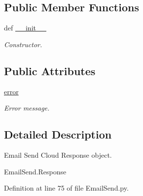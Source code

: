 \subsection*{Public Member Functions}
\begin{DoxyCompactItemize}
\item 
def \hyperlink{classRappCloud_1_1CloudMsgs_1_1EmailSend_1_1EmailSend_1_1Response_ac278f90863546918e2a7328700e0b972}{\-\_\-\-\_\-init\-\_\-\-\_\-}
\begin{DoxyCompactList}\small\item\em Constructor. \end{DoxyCompactList}\end{DoxyCompactItemize}
\subsection*{Public Attributes}
\begin{DoxyCompactItemize}
\item 
\hyperlink{classRappCloud_1_1CloudMsgs_1_1EmailSend_1_1EmailSend_1_1Response_a505fba3d24cb4e069ef8c1ce8e9541ed}{error}
\begin{DoxyCompactList}\small\item\em Error message. \end{DoxyCompactList}\end{DoxyCompactItemize}


\subsection{Detailed Description}
\begin{DoxyVerb}Email Send Cloud Response object.

EmailSend.Response
\end{DoxyVerb}
 

Definition at line 75 of file Email\-Send.\-py.



